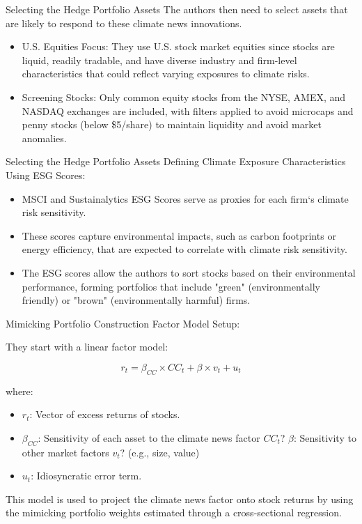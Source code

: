 \documentclass[11pt]{beamer}
\begin{document}
\begin{frame}{ Selecting the Hedge Portfolio Assets}
The authors then need to select assets that are likely to respond to these climate news innovations. 

	\begin{itemize}
		\item U.S. Equities Focus: They use U.S. stock market equities since stocks are liquid, readily tradable, and have diverse industry and firm-level characteristics that could reflect varying exposures to climate risks.

		\item Screening Stocks: Only common equity stocks from the NYSE, AMEX, and NASDAQ exchanges are included, with filters applied to avoid microcaps and penny stocks (below \$5/share) to maintain liquidity and avoid market anomalies.
	\end{itemize}
\end{frame}
\begin{frame}{ Selecting the Hedge Portfolio Assets}
Defining Climate Exposure Characteristics Using ESG Scores:

	\begin{itemize}
		\item MSCI and Sustainalytics ESG Scores serve as proxies for each firm`s climate risk sensitivity.

		\item These scores capture environmental impacts, such as carbon footprints or energy efficiency, that are expected to correlate with climate risk sensitivity.

		\item The ESG scores allow the authors to sort stocks based on their environmental performance, forming portfolios that include "green" (environmentally friendly) or "brown" (environmentally harmful) firms.
	\end{itemize}
\end{frame}
\begin{frame}{Mimicking Portfolio Construction}
Factor Model Setup:

They start with a linear factor model:

$$r_t=\beta_{CC}\times CC_t+\beta\times v_t +u_t$$

where:

	\begin{itemize}
		\item $r_t$: Vector of excess returns of stocks.

		\item $\beta_{CC}$: Sensitivity of each asset to the climate news factor $CC_t$? $\beta$: Sensitivity to other market factors $v_t$? (e.g., size, value)

		\item $u_t$: Idiosyncratic error term.

	\end{itemize}
This model is used to project the climate news factor onto stock returns by using the mimicking portfolio weights estimated through a cross-sectional regression.
\end{frame}
\end{document}
